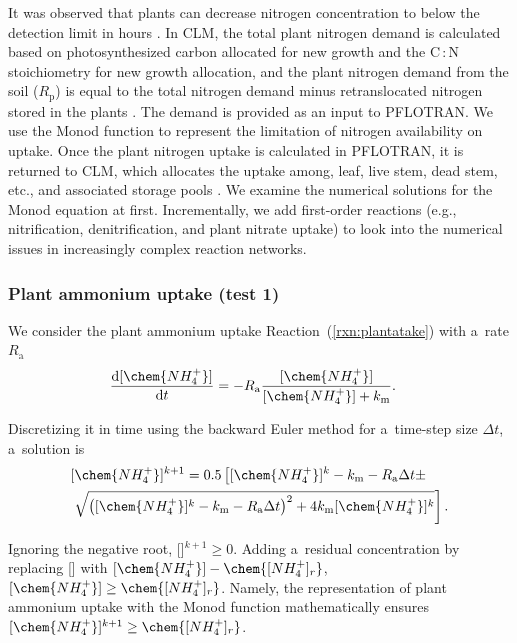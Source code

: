 \documentclass[gmd,noline]{copernicus}
\begin{document}
      It was observed that plants can decrease nitrogen concentration to
      below the detection limit in hours \citep{Kamer2001}. In CLM, the
      total plant nitrogen demand is calculated based on photosynthesized
      carbon allocated for new growth and the C\,:\,N stoichiometry for new
      growth allocation, and the plant nitrogen demand from the soil
      ($R_\mathrm{p}$) is equal to the total nitrogen demand minus
      retranslocated nitrogen stored in the plants \citep{Oleson2013}. The
      demand is provided as an input to PFLOTRAN. We use the Monod function
to represent the limitation of nitrogen availability on uptake. Once the
plant nitrogen uptake is calculated in PFLOTRAN, it is returned to CLM, which
allocates the uptake among, leaf, live stem, dead stem, etc., and
associated storage pools \citep{Oleson2013}. We
      examine the numerical solutions for the Monod equation at
      first. Incrementally, we add first-order reactions (e.g.,
      nitrification, denitrification, and plant nitrate uptake) to look into
      the numerical issues in increasingly complex reaction networks.



\subsubsection*{Plant ammonium uptake (test 1)}

      We consider the plant ammonium uptake Reaction~(\ref{rxn:plantatake})
      with a~rate $R_\mathrm{a}$
\begin{align}
 &
\frac{\mathrm{d} [\chem{NH_4^+}]}{\mathrm{d} t} =
- R_\mathrm{a} \frac{[\chem{NH_4^+}]}{[\chem{NH_4^+}]+k_\mathrm{m}}.
\label{eq:ex1}
\end{align}%

      Discretizing it in time using the backward Euler method for a~time-step size $\Delta t$, a~solution is
\begin{align}
 &
[\chem{NH_4^+}]^{k+1} = 0.5 \left[ [\chem{NH_4^+}]^k - k_\mathrm{m} -
R_\mathrm{a} \Delta t \pm \right.\nonumber\\&
\left.\sqrt{\left([\chem{NH_4^+}]^k - k_\mathrm{m} - R_\mathrm{a}\Delta
t\right)^2 + 4 k_\mathrm{m}[\chem{NH_4^+}]^k} \right]. \label{eq:monodsemi}
\end{align}%

      Ignoring the negative root, []$^{k+1}\geq 0$. Adding
      a~residual concentration by replacing [] with
      $[\chem{NH_4^+}]-\chem{[NH_4^+]_r}$,
      $[\chem{NH_4^+}]\geq\chem{[NH_4^+]_r}$.  Namely, the representation of
      plant ammonium uptake with the Monod function mathematically ensures
      $[\chem{NH_4^+}]^{k+1} \geq \chem{[NH_4^+]_r}$.
\end{document}
